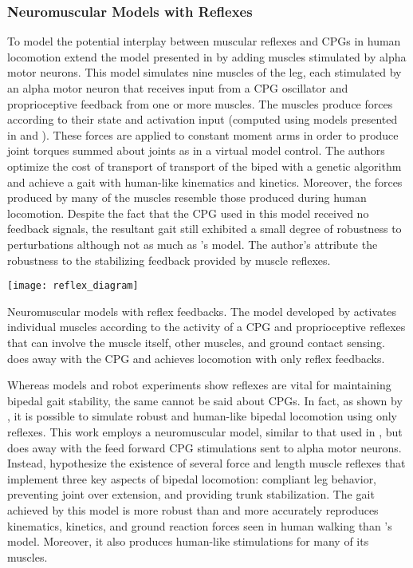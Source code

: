 \subsubsection{Neuromuscular Models with Reflexes}
To model the potential interplay between muscular reflexes and CPGs in human
locomotion \citet{ogihara2001generation} extend the model presented in
\citet{taga1991self} by adding muscles stimulated by alpha motor neurons. This
model simulates nine muscles of the leg, each stimulated by an alpha motor
neuron that receives input from a CPG oscillator and proprioceptive feedback
from one or more muscles. The muscles produce forces according to their state
and activation input (computed using models presented in
\citet{pierrynowski1985physiological} and \citet{davy1987dynamic}). These forces
are applied to constant moment arms in order to produce joint torques summed
about joints as in a virtual model control. The authors optimize the cost of
transport of transport of the biped with a genetic algorithm and achieve a gait
with human-like kinematics and kinetics. Moreover, the forces produced by many
of the muscles resemble those produced during human locomotion. Despite the fact
that the CPG used in this model received no feedback signals, the resultant gait
still exhibited a small degree of robustness to perturbations although not as
much as \citeauthor{taga1991self}'s model. The author's attribute the robustness
to the stabilizing feedback provided by muscle reflexes. 
\begin{marginfigure}
    \centering
    \texttt{[image: reflex\_diagram]} 
    \caption{Neuromuscular models with reflex feedbacks. The model developed by
    \citet{ogihara2001generation} activates individual muscles according to the
    activity of a CPG and proprioceptive reflexes that can involve the muscle
    itself, other muscles, and ground contact sensing.  \citet{geyer2010muscle}
    does away with the CPG and achieves locomotion with only reflex feedbacks.}
    \label{fig:reflex_diagram}
\end{marginfigure}

Whereas models and robot experiments show reflexes are vital for maintaining
bipedal gait stability, the same cannot be said about CPGs. In fact, as shown by
\citet{geyer2010muscle}, it is possible to simulate robust and human-like
bipedal locomotion using only reflexes. This work employs a neuromuscular
model, similar to that used in \citet{ogihara2001generation}, but does away with
the feed forward CPG stimulations sent to alpha motor neurons. Instead,
\citeauthor{geyer2010muscle} hypothesize the existence of several force and
length muscle reflexes that implement three key aspects of bipedal locomotion:
compliant leg behavior, preventing joint over extension, and providing trunk
stabilization. The gait achieved by this model is more robust than and more
accurately reproduces kinematics, kinetics, and ground reaction forces seen in
human walking than \citeauthor{ogihara2001generation}'s model. Moreover, it also
produces human-like stimulations for many of its muscles.


